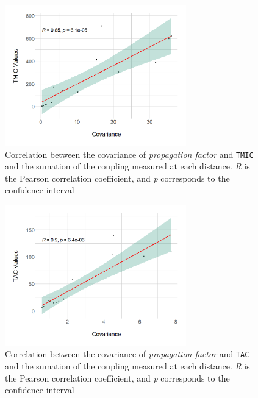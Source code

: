\begin{figure}[ht!]
\begin{center}
\includegraphics[width=0.7\textwidth]{figures/results/covariance-values-tmic.png}
\caption{Correlation between the covariance of \textit{propagation factor} and \texttt{TMIC} and the sumation of the coupling measured at each distance. \textit{R} is the Pearson correlation coefficient, and \textit{p} corresponds to the confidence interval}
\label{fig:cov-value-tmic}
\end{center}
\end{figure}

\begin{figure}[ht!]
\begin{center}
\includegraphics[width=0.7\textwidth]{figures/results/covariance-values-tac.png}
\caption{Correlation between the covariance of \textit{propagation factor} and \texttt{TAC} and the sumation of the coupling measured at each distance. \textit{R} is the Pearson correlation coefficient, and \textit{p} corresponds to the confidence interval}
\label{fig:cov-value-tac}
\end{center}
\end{figure}

